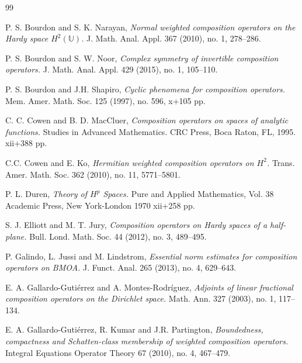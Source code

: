 \documentclass[11pt]{amsart}%
\theoremstyle{definition}
\theoremstyle{remark}
\numberwithin{equation}{section}
\begin{document}
\begin{thebibliography}{99}                                                                                               %






P. S. Bourdon and S. K. Narayan, \emph{Normal weighted
composition operators on the Hardy space $H^{2}(\mathbb{U})$.} J. Math. Anal.
Appl. 367 (2010), no. 1, 278--286.

P. S. Bourdon and S. W. Noor, \emph{Complex symmetry of
invertible composition operators.} J. Math. Anal. Appl. 429 (2015), no. 1, 105--110.

P. S. Bourdon and J.H. Shapiro, \emph{Cyclic phenomena for
composition operators.} Mem. Amer. Math. Soc. 125 (1997), no. 596, x+105 pp.

C. C. Cowen and B. D. MacCluer, \emph{Composition
operators on spaces of analytic functions.} Studies in Advanced Mathematics.
CRC Press, Boca Raton, FL, 1995. xii+388 pp.

C.C. Cowen and E. Ko, \emph{Hermitian weighted composition
operators on $H^{2}$.} Trans. Amer. Math. Soc. 362 (2010), no. 11, 5771--5801.

P. L. Duren, \emph{Theory of $H^{p}$ Spaces.} Pure and Applied
Mathematics, Vol. 38 Academic Press, New York-London 1970 xii+258 pp.

S. J. Elliott and M. T. Jury, \emph{Composition
operators on Hardy spaces of a half-plane.} Bull. Lond. Math. Soc. 44 (2012),
no. 3, 489--495.

P. Galindo, L. Jussi and M. Lindstrom, \emph{Essential norm
estimates for composition operators on BMOA.} J. Funct. Anal. 265 (2013), no.
4, 629--643.

E. A. Gallardo-Guti\'errez and A. Montes-Rodr\'iguez,
\emph{Adjoints of linear fractional composition operators on the Dirichlet
space.} Math. Ann. 327 (2003), no. 1, 117--134.

E. A. Gallardo-Guti\'errez, R. Kumar and J.R. Partington,\emph{ Boundedness, compactness and Schatten-class membership of weighted composition operators.} Integral Equations Operator Theory 67 (2010), no. 4, 467–479.



\end{thebibliography}
\end{document}
